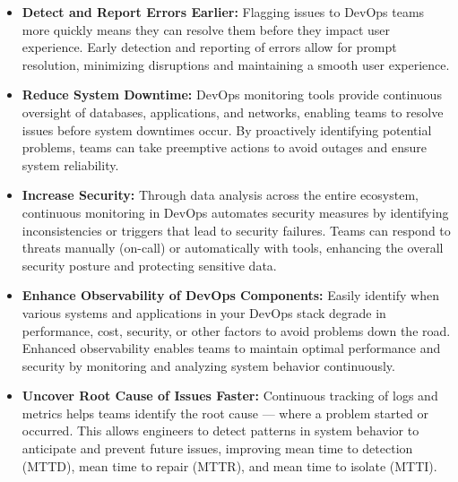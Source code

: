 \begin{itemize}
  \item \textbf{Detect and Report Errors Earlier:}
  Flagging issues to DevOps teams more quickly means they can resolve them before they impact user experience. Early detection and reporting of errors allow for prompt resolution, minimizing disruptions and maintaining a smooth user experience.
  \item \textbf{Reduce System Downtime:}
  DevOps monitoring tools provide continuous oversight of databases, applications, and networks, enabling teams to resolve issues before system downtimes occur. By proactively identifying potential problems, teams can take preemptive actions to avoid outages and ensure system reliability.

  \item \textbf{Increase Security:}
  Through data analysis across the entire ecosystem, continuous monitoring in DevOps automates security measures by identifying inconsistencies or triggers that lead to security failures. Teams can respond to threats manually (on-call) or automatically with tools, enhancing the overall security posture and protecting sensitive data.

  \item \textbf{Enhance Observability of DevOps Components:}
  Easily identify when various systems and applications in your DevOps stack degrade in performance, cost, security, or other factors to avoid problems down the road. Enhanced observability enables teams to maintain optimal performance and security by monitoring and analyzing system behavior continuously.

  \item \textbf{Uncover Root Cause of Issues Faster:}
  Continuous tracking of logs and metrics helps teams identify the root cause — where a problem started or occurred. This allows engineers to detect patterns in system behavior to anticipate and prevent future issues, improving mean time to detection (MTTD), mean time to repair (MTTR), and mean time to isolate (MTTI).
\end{itemize}

\section{}

